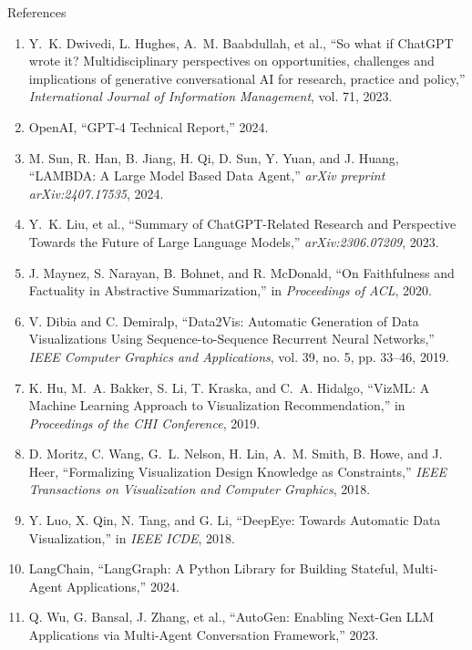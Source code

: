 
\begin{frame}[allowframebreaks]{References}
    \begin{enumerate}
        \scriptsize
        \item Y.~K. Dwivedi, L. Hughes, A.~M. Baabdullah, et al., ``So what if ChatGPT wrote it? Multidisciplinary perspectives on opportunities, challenges and implications of generative conversational AI for research, practice and policy,'' \textit{International Journal of Information Management}, vol. 71, 2023.
        \item OpenAI, ``GPT-4 Technical Report,'' 2024.
        \item M. Sun, R. Han, B. Jiang, H. Qi, D. Sun, Y. Yuan, and J. Huang, ``LAMBDA: A Large Model Based Data Agent,'' \textit{arXiv preprint arXiv:2407.17535}, 2024.
        \item Y.~K. Liu, et al., ``Summary of ChatGPT-Related Research and Perspective Towards the Future of Large Language Models,'' \textit{arXiv:2306.07209}, 2023.
        \item J. Maynez, S. Narayan, B. Bohnet, and R. McDonald, ``On Faithfulness and Factuality in Abstractive Summarization,'' in \textit{Proceedings of ACL}, 2020.
        \item V. Dibia and C. Demiralp, ``Data2Vis: Automatic Generation of Data Visualizations Using Sequence-to-Sequence Recurrent Neural Networks,'' \textit{IEEE Computer Graphics and Applications}, vol. 39, no. 5, pp. 33--46, 2019.
        \item K. Hu, M.~A. Bakker, S. Li, T. Kraska, and C.~A. Hidalgo, ``VizML: A Machine Learning Approach to Visualization Recommendation,'' in \textit{Proceedings of the CHI Conference}, 2019.
        \item D. Moritz, C. Wang, G.~L. Nelson, H. Lin, A.~M. Smith, B. Howe, and J. Heer, ``Formalizing Visualization Design Knowledge as Constraints,'' \textit{IEEE Transactions on Visualization and Computer Graphics}, 2018.
        \item Y. Luo, X. Qin, N. Tang, and G. Li, ``DeepEye: Towards Automatic Data Visualization,'' in \textit{IEEE ICDE}, 2018.
        \item LangChain, ``LangGraph: A Python Library for Building Stateful, Multi-Agent Applications,'' 2024.
        \item Q. Wu, G. Bansal, J. Zhang, et al., ``AutoGen: Enabling Next-Gen LLM Applications via Multi-Agent Conversation Framework,'' 2023.

\end{enumerate}
\end{frame}
